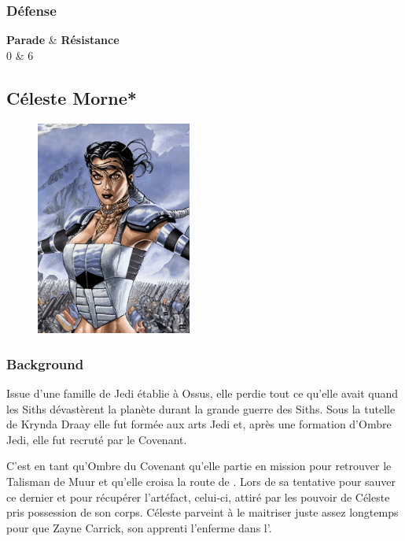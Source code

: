 \subsubsection{Défense}
\begin{itemtable}[ c c ]
    \textbf{Parade}     & \textbf{Résistance} \\
    0                   & 6 
\end{itemtable}

\newpage
\subsection{Céleste Morne*} \label{sec:celeste-morne}
\begin{figure}[h!]
    \centering
    \includegraphics[height=200pt]{_img/pnjs/celeste-morne.jpg}
\end{figure}

\subsubsection{Background}
Issue d’une famille de Jedi établie à Ossus, elle perdie tout ce qu’elle avait quand les Siths dévastèrent la planète durant la grande guerre des Siths. Sous la tutelle de Krynda Draay elle fut formée aux arts Jedi et, après une formation d’Ombre Jedi, elle fut recruté par le Covenant.

C’est en tant qu’Ombre du Covenant qu’elle partie en mission pour retrouver le Talisman de Muur et qu’elle croisa la route de . Lors de sa tentative pour sauver ce dernier et pour récupérer l’artéfact, celui-ci, attiré par les pouvoir de Céleste pris possession de son corps. Céleste parveint à le maitriser juste assez longtemps pour que Zayne Carrick, son apprenti l’enferme dans l’.

